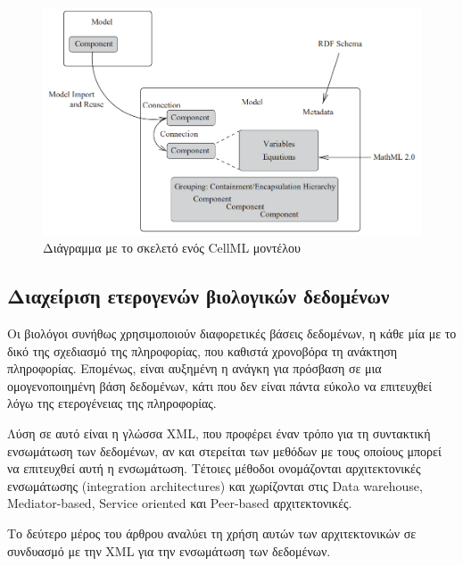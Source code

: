             \begin{figure}[ht] \noindent\centering
                \includegraphics[scale=0.7]{img/CellML structure}
                \caption{Διάγραμμα με το σκελετό ενός CellML μοντέλου \cite{CellML}}
            \end{figure}


    \subsection{Διαχείριση ετερογενών βιολογικών δεδομένων}
        Οι βιολόγοι συνήθως χρησιμοποιούν διαφορετικές βάσεις δεδομένων, η κάθε μία με το δικό της σχεδιασμό της πληροφορίας, που καθιστά χρονοβόρα τη ανάκτηση πληροφορίας.
        Επομένως, είναι αυξημένη η ανάγκη για πρόσβαση σε μια ομογενοποιημένη βάση δεδομένων, κάτι που δεν είναι πάντα εύκολο να επιτευχθεί λόγω της ετερογένειας της πληροφορίας.

        Λύση σε αυτό είναι η γλώσσα XML, που προφέρει έναν τρόπο για τη συντακτική ενσωμάτωση των δεδομένων, αν και στερείται των μεθόδων με τους οποίους μπορεί να επιτευχθεί αυτή η ενσωμάτωση.
        Τέτοιες μέθοδοι ονομάζονται αρχιτεκτονικές ενσωμάτωσης (integration architectures) και χωρίζονται στις Data warehouse, Mediator-based, Service oriented και Peer-based αρχιτεκτονικές.

        Το δεύτερο μέρος του άρθρου αναλύει τη χρήση αυτών των αρχιτεκτονικών σε συνδυασμό με την XML για την ενσωμάτωση των δεδομένων.

